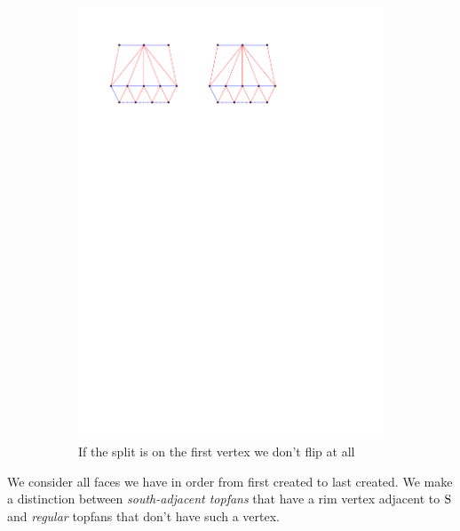 \begin{figure}
\begin{subfigure}[b]{0.45 \textwidth}
    \end{subfigure}
    ~
    \begin{subfigure}[b]{0.45 \textwidth}
        \includegraphics[width =\textwidth]{topFanFlips/img/splitfront}
        \caption{If the split is on the first vertex we don't flip at all}
        \label{fig:fanflip:splitFirstVertex}

    \end{subfigure}

    \caption{}
    \label{fig:fanflip:fanflips}
\end{figure}



We consider all faces we have in order from first created to last created. We make a distinction between \emph{south-adjacent topfans} that have a rim vertex adjacent to $\mathrm{S}$ and \emph{regular} topfans that don't have such a vertex.

